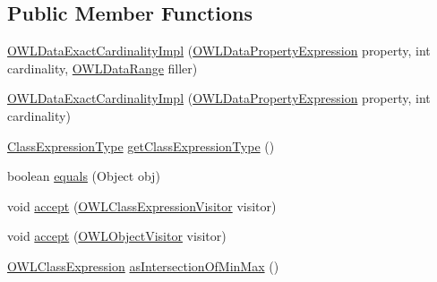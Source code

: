 \subsection*{Public Member Functions}
\begin{DoxyCompactItemize}
\item 
\hyperlink{classuk_1_1ac_1_1manchester_1_1cs_1_1owl_1_1owlapi_1_1_o_w_l_data_exact_cardinality_impl_ac5d6d964674e005d6da162f7a9812662}{O\-W\-L\-Data\-Exact\-Cardinality\-Impl} (\hyperlink{interfaceorg_1_1semanticweb_1_1owlapi_1_1model_1_1_o_w_l_data_property_expression}{O\-W\-L\-Data\-Property\-Expression} property, int cardinality, \hyperlink{interfaceorg_1_1semanticweb_1_1owlapi_1_1model_1_1_o_w_l_data_range}{O\-W\-L\-Data\-Range} filler)
\item 
\hyperlink{classuk_1_1ac_1_1manchester_1_1cs_1_1owl_1_1owlapi_1_1_o_w_l_data_exact_cardinality_impl_a028792b09d6e5643434f0d4fa97bfb79}{O\-W\-L\-Data\-Exact\-Cardinality\-Impl} (\hyperlink{interfaceorg_1_1semanticweb_1_1owlapi_1_1model_1_1_o_w_l_data_property_expression}{O\-W\-L\-Data\-Property\-Expression} property, int cardinality)
\item 
\hyperlink{enumorg_1_1semanticweb_1_1owlapi_1_1model_1_1_class_expression_type}{Class\-Expression\-Type} \hyperlink{classuk_1_1ac_1_1manchester_1_1cs_1_1owl_1_1owlapi_1_1_o_w_l_data_exact_cardinality_impl_a63e309e786d2af5232cbafc0992d7550}{get\-Class\-Expression\-Type} ()
\item 
boolean \hyperlink{classuk_1_1ac_1_1manchester_1_1cs_1_1owl_1_1owlapi_1_1_o_w_l_data_exact_cardinality_impl_a227ec9cdf2d8afcaf93c4ff8c329c27f}{equals} (Object obj)
\item 
void \hyperlink{classuk_1_1ac_1_1manchester_1_1cs_1_1owl_1_1owlapi_1_1_o_w_l_data_exact_cardinality_impl_a161c3fc886b4a3c4dc0e0b447a2e1b30}{accept} (\hyperlink{interfaceorg_1_1semanticweb_1_1owlapi_1_1model_1_1_o_w_l_class_expression_visitor}{O\-W\-L\-Class\-Expression\-Visitor} visitor)
\item 
void \hyperlink{classuk_1_1ac_1_1manchester_1_1cs_1_1owl_1_1owlapi_1_1_o_w_l_data_exact_cardinality_impl_a0be18688da6a54c75993d97baaa6c59f}{accept} (\hyperlink{interfaceorg_1_1semanticweb_1_1owlapi_1_1model_1_1_o_w_l_object_visitor}{O\-W\-L\-Object\-Visitor} visitor)
\item 
\hyperlink{interfaceorg_1_1semanticweb_1_1owlapi_1_1model_1_1_o_w_l_class_expression}{O\-W\-L\-Class\-Expression} \hyperlink{classuk_1_1ac_1_1manchester_1_1cs_1_1owl_1_1owlapi_1_1_o_w_l_data_exact_cardinality_impl_a6fe5c6101f0f7290f82a9863c6be7cba}{as\-Intersection\-Of\-Min\-Max} ()
\end{DoxyCompactItemize}
